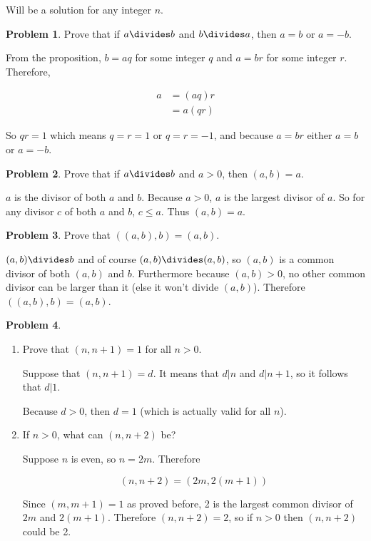 \documentclass{article}
\theoremstyle{definition}
\newtheorem{problem}{Problem}
\begin{document}
  Will be a solution for any integer $n$.
  
  \begin{problem}
  Prove that if $a \divides b$ and $b \divides a$, then $a = b$ or $a = -b$.
  \end{problem}
  
  From the proposition, $b = aq$ for some integer $q$ and $a = br$ for some integer $r$.
  Therefore,
  
  \begin{align*}
    a &= (aq)r \\
    &= a(qr)
  \end{align*}
  
  So $qr = 1$ which means $q = r = 1$ or $q = r = -1$, and because $a = br$ either
  $a = b$ or $a = -b$.
  
  \begin{problem}
    Prove that if $a \divides b$ and $a > 0$, then $(a, b) = a$.
  \end{problem}
  
  $a$ is the divisor of both $a$ and $b$. Because $a > 0$, $a$ is the largest divisor of $a$.
  So for any divisor $c$ of both $a$ and $b$, $c \leq a$. Thus $(a, b) = a$.
  
  \begin{problem}
    Prove that $((a, b), b) = (a, b)$.
  \end{problem}
  
  $(a, b) \divides b$ and of course $(a, b) \divides (a, b)$, so $(a, b)$ is a common divisor of both $(a, b)$ and $b$.
  Furthermore because $(a, b) > 0$, no other common divisor can be larger than it (else it won't divide $(a, b)$).
  Therefore $((a, b), b) = (a, b)$.
  
  \begin{problem}
    ~
  \end{problem}
  
  \begin{enumerate}[label=\alph*)]
      \item Prove that $(n, n + 1) = 1$ for all $n > 0$.
      
      Suppose that $(n, n + 1) = d$. It means that $d | n$ and $d | n + 1$, so it follows that $d | 1$.
  
      Because $d > 0$, then $d = 1$ (which is actually valid for all $n$).
      
      \item If $n > 0$, what can $(n, n + 2)$ be?
      
      Suppose $n$ is even, so $n = 2m$. Therefore
      
      \begin{equation*}
        (n, n + 2) = (2m, 2(m + 1))
      \end{equation*}
      
      Since $(m, m + 1) = 1$ as proved before, 2 is the largest common divisor of $2m$ and $2(m + 1)$.
      Therefore $(n, n + 2) = 2$, so if $n > 0$ then $(n, n + 2)$ could be 2.
  \end{enumerate}
    
\end{document}
